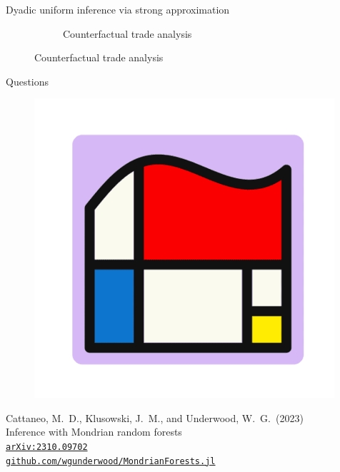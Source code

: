 \documentclass{beamer}
\begin{document}
\begin{frame}{Dyadic uniform inference via strong approximation}
\begin{figure}[H]
\begin{subfigure}{0.49\textwidth}
{        \vspace*{-3mm}
        \caption{
        Counterfactual trade analysis}
      }
    \end{subfigure}
  \end{figure}

\end{frame}

\begin{frame}{Questions}

  \begin{minipage}{0.20\textwidth}
    \begin{figure}[ht]
      \centering
      \hspace*{-3mm}%
      \includegraphics[width=0.99\textwidth]{graphics/logo_mondrian.png}%
      \hspace*{0mm}%
    \end{figure}
  \end{minipage}
  \begin{minipage}{0.79\textwidth}
    \footnotesize{
      Cattaneo, M.\ D.,
      Klusowski, J.\ M.,
      and Underwood, W.\ G.\ (2023) \\
      Inference with Mondrian random forests \\
      \href{https://arxiv.org/abs/2310.09702}%
      {\texttt{arXiv:2310.09702}} \\
      \href{https://github.com/WGUNDERWOOD/MondrianForests.jl}%
      {\texttt{github.com/wgunderwood/MondrianForests.jl}}
    }
  \end{minipage}


\end{frame}
\end{document}
